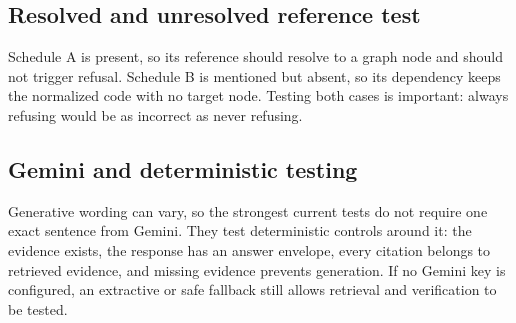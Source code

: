 \documentclass[11pt,letterpaper]{article}
\begin{document}
\subsection{Resolved and unresolved reference test}
Schedule A is present, so its reference should resolve to a graph node and should not trigger refusal. Schedule B is mentioned but absent, so its dependency keeps the normalized code with no target node. Testing both cases is important: always refusing would be as incorrect as never refusing.

\subsection{Gemini and deterministic testing}
Generative wording can vary, so the strongest current tests do not require one exact sentence from Gemini. They test deterministic controls around it: the evidence exists, the response has an answer envelope, every citation belongs to retrieved evidence, and missing evidence prevents generation. If no Gemini key is configured, an extractive or safe fallback still allows retrieval and verification to be tested.

\newpage
\end{document}
